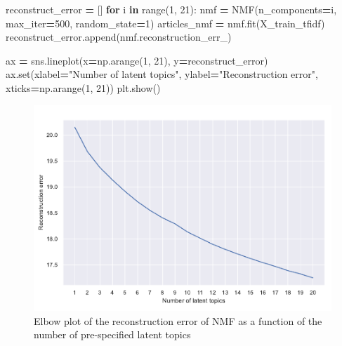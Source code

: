 \documentclass[a4paper, oneside]{report}
\newenvironment{Shaded}{\begin{snugshade}}{\end{snugshade}}
\newcommand{\BuiltInTok}[1]{#1}
\newcommand{\ControlFlowTok}[1]{\textcolor[rgb]{0.13,0.29,0.53}{\textbf{#1}}}
\newcommand{\DecValTok}[1]{\textcolor[rgb]{0.00,0.00,0.81}{#1}}
\newcommand{\KeywordTok}[1]{\textcolor[rgb]{0.13,0.29,0.53}{\textbf{#1}}}
\newcommand{\NormalTok}[1]{#1}
\newcommand{\OperatorTok}[1]{\textcolor[rgb]{0.81,0.36,0.00}{\textbf{#1}}}
\newcommand{\StringTok}[1]{\textcolor[rgb]{0.31,0.60,0.02}{#1}}
\renewenvironment{Shaded}
{
  \vspace{4pt}%
  \begin{snugshade}%
}{%
  \end{snugshade}%
  \vspace{4pt}%
}
\begin{document}
\begin{Shaded}
\begin{Highlighting}[]
\NormalTok{reconstruct\_error }\OperatorTok{=}\NormalTok{ []}
\ControlFlowTok{for}\NormalTok{ i }\KeywordTok{in} \BuiltInTok{range}\NormalTok{(}\DecValTok{1}\NormalTok{, }\DecValTok{21}\NormalTok{):}
\NormalTok{  nmf }\OperatorTok{=}\NormalTok{ NMF(n\_components}\OperatorTok{=}\NormalTok{i, max\_iter}\OperatorTok{=}\DecValTok{500}\NormalTok{, random\_state}\OperatorTok{=}\DecValTok{1}\NormalTok{)}
\NormalTok{  articles\_nmf }\OperatorTok{=}\NormalTok{ nmf.fit(X\_train\_tfidf)}
\NormalTok{  reconstruct\_error.append(nmf.reconstruction\_err\_)}

\NormalTok{ax }\OperatorTok{=}\NormalTok{ sns.lineplot(x}\OperatorTok{=}\NormalTok{np.arange(}\DecValTok{1}\NormalTok{, }\DecValTok{21}\NormalTok{), y}\OperatorTok{=}\NormalTok{reconstruct\_error)}
\NormalTok{ax.}\BuiltInTok{set}\NormalTok{(xlabel}\OperatorTok{=}\StringTok{"Number of latent topics"}\NormalTok{, ylabel}\OperatorTok{=}\StringTok{"Reconstruction error"}\NormalTok{, xticks}\OperatorTok{=}\NormalTok{np.arange(}\DecValTok{1}\NormalTok{, }\DecValTok{21}\NormalTok{))}
\NormalTok{plt.show()}
\end{Highlighting}
\end{Shaded}

\begin{figure}
\centering
\includegraphics{versions/Chin_Chapter_4_2022-01-10_files/figure-latex/unnamed-chunk-9-1.pdf}
\caption{Elbow plot of the reconstruction error of NMF as a function of
the number of pre-specified latent topics}
\end{figure}
\end{document}
